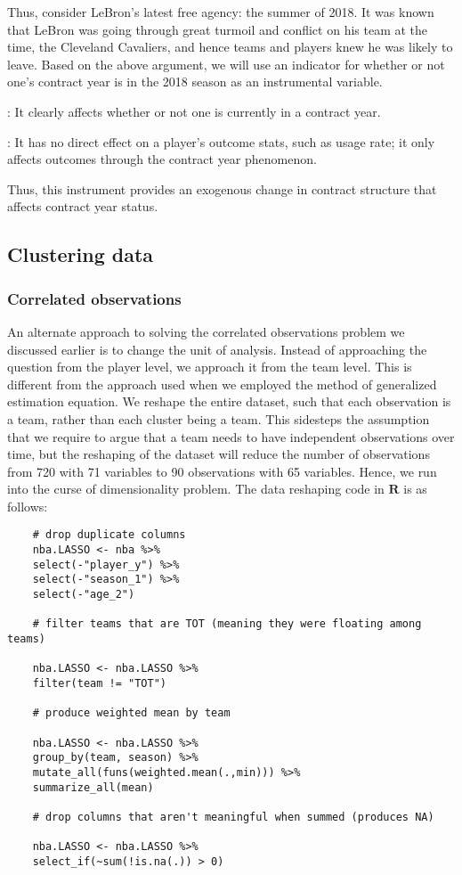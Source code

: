 \documentclass[12pt]{article}
\begin{document}
	Thus, consider LeBron’s latest free agency: the summer of 2018. It was known that LeBron was going through great turmoil and conflict on his team at the time, the Cleveland Cavaliers, and hence teams and players knew he was likely to leave. Based on the above argument, we will use an indicator for whether or not one’s contract year is in the 2018 season as an instrumental variable.
	
	: It clearly affects whether or not one is currently in a contract year.
	
	: It has no direct effect on a player’s outcome stats, such as usage rate; it only affects outcomes through the contract year phenomenon.
	
	Thus, this instrument provides an exogenous change in contract structure that affects contract year status.
	
	\subsection{Clustering data}
	
	\subsubsection{Correlated observations}
	
	An alternate approach to solving the correlated observations problem we discussed earlier is to change the unit of analysis. Instead of approaching the question from the player level, we approach it from the team level. This is different from the approach used when we employed the method of generalized estimation equation. We reshape the entire dataset, such that each observation is a team, rather than each cluster being a team. This sidesteps the assumption that we require to argue that a team needs to have independent observations over time, but the reshaping of the dataset will reduce the number of observations from 720 with 71 variables to 90 observations with 65 variables. Hence, we run into the curse of dimensionality problem. The data reshaping code in $\textbf{R}$ is as follows:
	
	\begin{lstlisting}
	# drop duplicate columns
	nba.LASSO <- nba %>%
	select(-"player_y") %>%
	select(-"season_1") %>%
	select(-"age_2")
	
	# filter teams that are TOT (meaning they were floating among teams)
	
	nba.LASSO <- nba.LASSO %>%
	filter(team != "TOT")
	
	# produce weighted mean by team
	
	nba.LASSO <- nba.LASSO %>%
	group_by(team, season) %>%
	mutate_all(funs(weighted.mean(.,min))) %>%
	summarize_all(mean)
	
	# drop columns that aren't meaningful when summed (produces NA)
	
	nba.LASSO <- nba.LASSO %>%
	select_if(~sum(!is.na(.)) > 0)
	\end{lstlisting}
	
\end{document}
